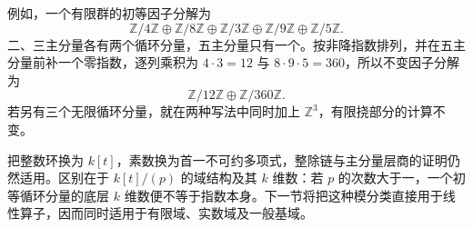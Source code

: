 \ProseParagraphBreak
例如，一个有限群的初等因子分解为
\[
	\mathbb Z/4\mathbb Z\oplus\mathbb Z/8\mathbb Z \oplus\mathbb Z/3\mathbb Z\oplus\mathbb Z/9\mathbb Z \oplus\mathbb Z/5\mathbb Z.
\]
二、三主分量各有两个循环分量，五主分量只有一个。按非降指数排列，并在五主分量前补一个零指数，逐列乘积为 \(4\cdot3=12\) 与 \(8\cdot9\cdot5=360\)，所以不变因子分解为
\[
	\mathbb Z/12\mathbb Z\oplus\mathbb Z/360\mathbb Z.
\]
若另有三个无限循环分量，就在两种写法中同时加上 \(\mathbb Z^3\)，有限挠部分的计算不变。

\ProseParagraphBreak
把整数环换为 \(k[t]\)，素数换为首一不可约多项式，整除链与主分量层商的证明仍然适用。区别在于 \(k[t]/(p)\) 的域结构及其 \(k\) 维数：若 \(p\) 的次数大于一，一个初等循环分量的底层 \(k\) 维数便不等于指数本身。下一节将把这种模分类直接用于线性算子，因而同时适用于有限域、实数域及一般基域。
